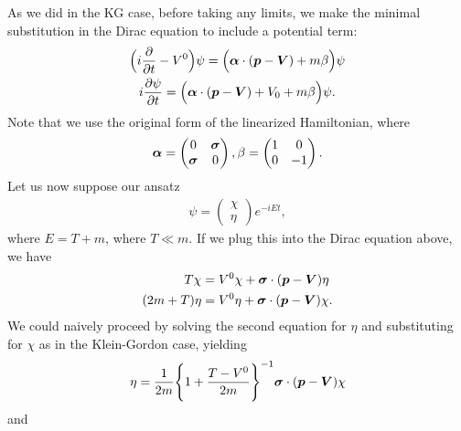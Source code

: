 As we did in the KG case, before taking any limits, we make the minimal substitution in the Dirac equation to include a potential term:
\begin{gather}
    \Big( i \pdv{t} - V^{0} \Big) \psi = \Big( \vb*{\alpha} \cdot ( \vb*{p} - \vb*{V} ) + m \beta \Big) \psi \nonumber \\
    i \pdv{\psi}{t} = \Big( \vb*{\alpha} \cdot ( \vb*{p} - \vb*{V} ) + V_0 + m \beta \Big) \psi
.\end{gather}
Note that we use the original form of the linearized Hamiltonian, where
\begin{align}
    \vb*{\alpha} = \begin{pmatrix}
        0 & \vb*{\sigma} \\
        \vb*{\sigma} & 0
    \end{pmatrix}
    ,
    \beta = \begin{pmatrix}
        1 & 0 \\
        0 & -1
    \end{pmatrix}
.\end{align}
Let us now suppose our ansatz
\begin{align}
    \psi = 
    \begin{pmatrix}
        \chi \\ \eta
    \end{pmatrix}
    e^{-i E t}
,\end{align}
where $E = T + m$, where $T \ll m$.
If we plug this into the Dirac equation above, we have
\begin{align}
    T \chi &= V^{0} \chi + \vb*{\sigma} \cdot (\vb*{p} - \vb*{V}) \eta \\
    (2m + T) \eta &= V^{0} \eta + \vb*{\sigma} \cdot ( \vb*{p} - \vb*{V} ) \chi
.\end{align}
We could naively proceed by solving the second equation for $\eta$ and substituting for $\chi$ as in the Klein-Gordon case, yielding
\begin{align}
    \eta = \frac{1}{2m} \Bigg\{ 1 + \frac{T - V^{0}}{2m} \Bigg\}^{-1} \vb*{\sigma} \cdot (\vb*{p} - \vb*{V}) \chi
\end{align}
and
